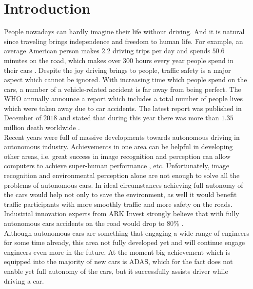 
\chapter{Introduction}
\label{chap:0}

People nowadays can hardly imagine their life without driving. And it is natural since traveling brings independence and freedom to human life. For example, an average American person makes $2.2$ driving trips per day and spends $50.6$ minutes on the road, which makes over $300$ hours every year people spend in their cars \cite{americanDriving}. Despite the joy driving brings to people, traffic safety is a major aspect which cannot be ignored. With increasing time which people spend on the cars, a number of a vehicle-related accident is far away from being perfect. The \gls{WHO} annually announce a report which includes a total number of people lives which were taken away due to car accidents. The latest report was published in December of $2018$ and stated that during this year there was more than $1.35$ million death worldwide \cite{WHOstatistics}. \\

Recent years were full of massive developments towards autonomous driving in autonomous industry. Achievements in one area can be helpful in developing other areas, i.e. great success in image recognition and perception can allow computers to achieve super-human performance \cite{SuperComputer}, etc. Unfortunately, image recognition and environmental perception alone are not enough to solve all the problems of autonomous cars. In ideal circumstances achieving full autonomy of the cars would help not only to save the environment, as well it would benefit traffic participants with more smoothly traffic and more safety on the roads. Industrial innovation experts from ARK Invest strongly believe that with fully autonomous cars accidents on the road would drop to $80$\% \cite{ARKInvest}.\\

Although autonomous cars are something that engaging a wide range of engineers for some time already, this area not fully developed yet and will continue engage engineers even more in the future. At the moment big achievement which is equipped into the majority of new cars is \gls{ADAS}, which for the fact does not enable yet full autonomy of the cars, but it successfully assists driver while driving a car.\\

